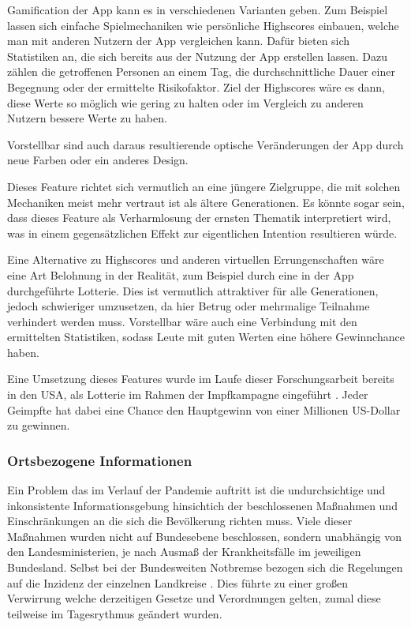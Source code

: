 \documentclass[conference,compsoc]{IEEEtran}
\begin{document}
Gamification der App kann es in verschiedenen Varianten geben. 
Zum Beispiel lassen sich einfache Spielmechaniken wie persönliche Highscores einbauen, welche man mit anderen Nutzern der App vergleichen kann. 
Dafür bieten sich Statistiken an, die sich bereits aus der Nutzung der App erstellen lassen. 
Dazu zählen die getroffenen Personen an einem Tag, die durchschnittliche Dauer einer Begegnung oder der ermittelte Risikofaktor. 
Ziel der Highscores wäre es dann, diese Werte so möglich wie gering zu halten oder im Vergleich zu anderen Nutzern bessere Werte zu haben.

Vorstellbar sind auch daraus resultierende optische Veränderungen der App durch neue Farben oder ein anderes Design.

Dieses Feature richtet sich vermutlich an eine jüngere Zielgruppe, die mit solchen Mechaniken meist mehr vertraut ist als ältere Generationen.
Es könnte sogar sein, dass dieses Feature als Verharmlosung der ernsten Thematik interpretiert wird, was in einem gegensätzlichen Effekt zur eigentlichen Intention resultieren würde.

Eine Alternative zu Highscores und anderen virtuellen Errungenschaften wäre eine Art Belohnung in der Realität, zum Beispiel durch eine in der App durchgeführte Lotterie.
Dies ist vermutlich attraktiver für alle Generationen, jedoch schwieriger umzusetzen, da hier Betrug oder mehrmalige Teilnahme verhindert werden muss. 
Vorstellbar wäre auch eine Verbindung mit den ermittelten Statistiken, sodass Leute mit guten Werten eine höhere Gewinnchance haben.

Eine Umsetzung dieses Features wurde im Laufe dieser Forschungsarbeit bereits in den USA, als Lotterie im Rahmen der Impfkampagne eingeführt \cite{Lotto}.
Jeder Geimpfte hat dabei eine Chance den Hauptgewinn von einer Millionen US-Dollar zu gewinnen.\\

\subsubsection{Ortsbezogene Informationen}
Ein Problem das im Verlauf der Pandemie auftritt ist die undurchsichtige und inkonsistente Informationsgebung 
hinsichtich der beschlossenen Maßnahmen und Einschränkungen an die sich die Bevölkerung richten muss. 
Viele dieser Maßnahmen wurden nicht auf Bundesebene beschlossen, sondern unabhängig von den Landesministerien, je nach Ausmaß der Krankheitsfälle im jeweiligen Bundesland.
Selbst bei der Bundesweiten Notbremse bezogen sich die Regelungen auf die Inzidenz der einzelnen Landkreise \cite{Notbremse}.
Dies führte zu einer großen Verwirrung welche derzeitigen Gesetze und Verordnungen gelten, zumal diese teilweise im Tagesrythmus geändert wurden.
\end{document}
